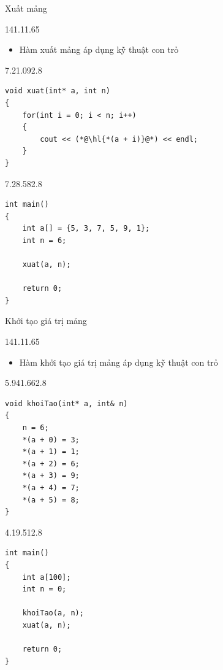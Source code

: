 \begin{frame}[fragile]{Xuất mảng}
\begin{blk}{14}{1.1}{1.65}\begin{itemize}\small\item Hàm xuất mảng áp dụng kỹ thuật con trỏ\end{itemize}\end{blk}
\begin{blk}{7.2}{1.09}{2.8}
\begin{lstlisting}[basicstyle=\cf{10.8}]
void xuat(int* a, int n)
{
    for(int i = 0; i < n; i++)
    {
        cout << (*@\hl{*(a + i)}@*) << endl;
    }
}
\end{lstlisting}
\end{blk}
\begin{blk}{7.2}{8.58}{2.8}
\begin{lstlisting}[basicstyle=\cf{10.3}]
int main()
{
    int a[] = {5, 3, 7, 5, 9, 1};
    int n = 6;

    xuat(a, n);

    return 0;
}
\end{lstlisting}
\end{blk}
\end{frame}

\begin{frame}[fragile]{Khởi tạo giá trị mảng}
\begin{blk}{14}{1.1}{1.65}\begin{itemize}\small\item Hàm khởi tạo giá trị mảng áp dụng kỹ thuật con trỏ\end{itemize}\end{blk}
\begin{blk}{5.94}{1.66}{2.8}
\begin{lstlisting}[basicstyle=\cf{10}]
void khoiTao(int* a, int& n)
{
    n = 6;
    *(a + 0) = 3;
    *(a + 1) = 1;
    *(a + 2) = 6;
    *(a + 3) = 9;
    *(a + 4) = 7;
    *(a + 5) = 8;
}
\end{lstlisting}
\end{blk}
\begin{blk}{4.1}{9.51}{2.8}
\begin{lstlisting}[basicstyle=\cf{10}]
int main()
{
    int a[100];
    int n = 0;

    khoiTao(a, n);
    xuat(a, n);

    return 0;
}
\end{lstlisting}
\end{blk}
\end{frame}

